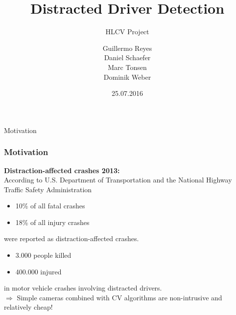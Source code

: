 \documentclass{beamer}
\title{Distracted Driver Detection}
\subtitle{HLCV Project}
\author[Reyes, Schaefer, Tonsen, Weber]{Guillermo Reyes \\
	 Daniel Schaefer \\
	 Marc Tonsen \\
 Dominik Weber\\}
\institute[]{Saarland University}
\date{25.07.2016}
\begin{document}
	\begin{frame}
		\titlepage
	\end{frame}


    \begin{frame}{Motivation}
		\frametitle{Motivation}
        \textbf{Distraction-affected crashes 2013:}\\
        \vspace{0.5cm}
        According to U.S. Department of Transportation and the National Highway Traffic Safety Administration \cite{knuthwebsite}
		\begin{itemize}
            \item 10\% of all fatal crashes
			\item 18\% of all injury crashes
		\end{itemize}
        were reported as distraction-affected crashes.\\
        \begin{itemize}
            \item 3.000 people killed
            \item 400.000 injured
        \end{itemize}
        in motor vehicle crashes involving distracted drivers.\\
		\vspace{0.5cm}
		$\Rightarrow$ Simple cameras combined with CV algorithms are non-intrusive and relatively cheap! %
	\end{frame}
	
\end{document}
